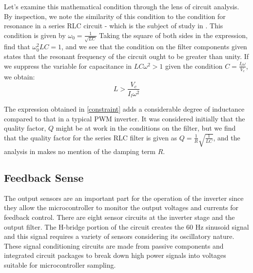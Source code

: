 Let's examine this mathematical condition through the lens of circuit analysis. By inspection, we note the similarity of this condition to the condition for resonance in a series RLC circuit - which is the subject of study in \cite{ricardo}. This condition is given by $\omega_0 = \frac{1}{\sqrt{LC}}$ Taking the square of both sides in the expression, find that $\omega_0^2LC=1$, and we see that the condition on the filter components given states that the resonant frequency of the circuit ought to be greater than unity. If we suppress the variable for capacitance in 
$LC\omega^2>1$ given the condition $C=\frac{I_l\omega}{V_c}$, we obtain:
\begin{equation}
\label{constraint}
L > \frac{V_c}{I_l\omega^2}
\end{equation}

The expression obtained in \ref{constraint} adds a considerable degree of inductance compared to that in a typical PWM inverter. It was considered initially that the quality factor, $Q$ might be at work in the conditions on the filter, but we find that the quality factor for the series RLC filter is given as $Q = \frac{1}{R}\sqrt{\frac{1}{LC}}$, and the analysis in \cite{ricardo} makes no mention of the damping term $R$.

\subsection{Feedback Sense}
The output sensors are an important part for the operation of the inverter since they allow the microcontroller to monitor the output voltages and currents for feedback control. There are eight sensor circuits at the inverter stage and the output filter. The H-bridge portion of the circuit creates the 60 Hz sinusoid signal and this signal requires a variety of sensors considering its oscillatory nature. These signal conditioning circuits are made from passive components and integrated circuit packages to break down high power signals into voltages suitable for microcontroller sampling. 
	
